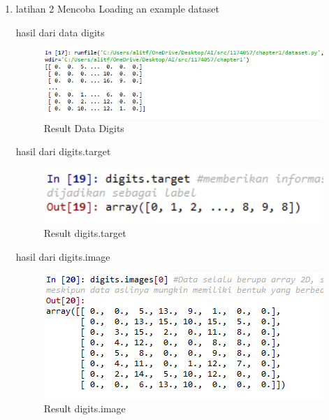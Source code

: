 \begin{enumerate}
		\item latihan 2 Mencoba Loading an example dataset
		
		\subitem hasil dari data digits
		\begin{figure}[H]
		\centering
		\includegraphics[width=1.5\textwidth]{figures/1174057/chapter1/4.png}
		\caption{Result Data Digits}
		\label{print}
		\end{figure}

		\subitem hasil dari digits.target
		\begin{figure}[H]
		\centering
		\includegraphics[width=1\textwidth]{figures/1174057/chapter1/5.png}
		\caption{Result digits.target}
		\label{print}
		\end{figure}

		\subitem hasil dari digits.image
		\begin{figure}[H]
		\centering
		\includegraphics[width=1\textwidth]{figures/1174057/chapter1/6.png}
		\caption{Result digits.image}
		\label{print}
		\end{figure}


\end{enumerate}
